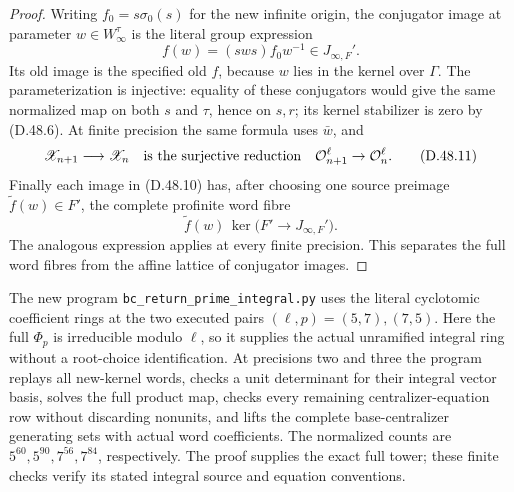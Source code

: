 \begin{proof}
Writing \(f_0=s\sigma_0(s)\) for
the new infinite origin, the
conjugator image at parameter
\(w\in W_\infty^\tau\) is the
literal group expression
\[
       f(w)=(sws)f_0w^{-1}\in J_{\infty,F}'.
 \tag{D.48.10}
\]
Its old image is the specified
old \(f\), because \(w\) lies
in the kernel over \(\Gamma\).
The parameterization is injective:
equality of these conjugators
would give the same normalized
map on both \(s\) and \(\tau\),
hence on \(s,r\); its kernel
stabilizer is zero by
\textup{(D.48.6)}.
At finite precision the same
formula uses \(\bar w\), and
\[
     \mathscr X_{n+1}\longrightarrow\mathscr X_n
        \quad\hbox{is the surjective reduction}
        \quad\mathcal O_{n+1}^\ell\to\mathcal O_n^\ell.
 \tag{D.48.11}
\]
Finally each image in
\textup{(D.48.10)} has, after
choosing one source preimage
\(\widetilde f(w)\in F'\),
the complete profinite word fibre
\[
 \widetilde f(w)\,
    \ker\bigl(F'\longrightarrow J_{\infty,F}'\bigr).
 \tag{D.48.12}
\]
The analogous expression applies
at every finite precision.
This separates the full word
fibres from the affine lattice
of conjugator images.
\end{proof}

The new program
\texttt{bc\_return\_prime\_integral.py}
uses the literal cyclotomic coefficient rings
at the two executed pairs \((\ell,p)=(5,7),(7,5)\).
Here the full \(\Phi_p\) is irreducible
modulo \(\ell\), so it supplies the actual
unramified integral ring without a root-choice
identification. At precisions two and three
the program replays all new-kernel words,
checks a unit determinant for their integral
vector basis, solves the full product map,
checks every remaining centralizer-equation
row without discarding nonunits, and lifts the complete
base-centralizer generating sets with actual
word coefficients. The normalized counts are
\(5^{60},5^{90},7^{56},7^{84}\), respectively.
The proof supplies the exact full tower;
these finite checks verify its stated
integral source and equation conventions.
